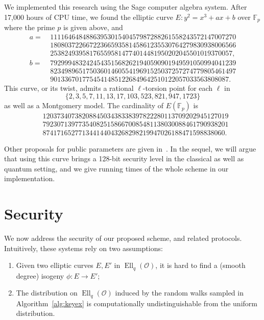 \documentclass{article}
\newcommand{\F}{\mathbb{F}}
\renewcommand{\O}{\mathcal{O}}
\theoremstyle{definition}
\DeclareMathOperator{\Ell}{Ell}
\begin{document}
We implemented this research using the Sage computer algebra system.
After 17,000 hours of CPU time, we found the elliptic curve
$
	E : y^2 = x^3 + ax + b
$
over $\F_p$ where the prime $p$ is given above, and
\[
\begin{aligned}
a =\ & 1111646484886395301540457987288261558243572147007270 \\ 
& 1808037226672236659358145861235530764279830938006566 \\
& 253824939581765595814774014481950202045501019370057,\\
b =\ & 7929994832424543515682621940590901949591050994041239 \\
& 8234989651750360146055419691525037257274779805461497 \\ 
& 90133670177545414851226849642510122057033563808087.
\end{aligned}
\]
This curve, or its twist, admits a rational $\ell$-torsion point 
for each $\ell$ in
\[
  \{2, 3, 5, 7, 11, 13, 17, 103, 523, 821, 947, 1723\}
\]
as well as a Montgomery model. The cardinality of $E(\F_p)$ is
\[
\begin{aligned}
& 1203734073820884503438338397822280113709202945127019 \\ 
& 7923071397735408251586670085481138030088461790938201 \\
& 874171652771344144043268298219947026188471598838060.
\end{aligned}
\]

Other proposals for public parameters are given in~\cite{todo:memoire}.
In the sequel, we will argue that using this curve brings a 128-bit security level
in the classical as well as quantum setting, and we give running times of the whole
scheme in our implementation.

\section{Security}
\label{sec:sec}

We now address the security of our proposed scheme, and related
protocols. Intuitively, these systems rely on two assumptions:
\begin{enumerate}
\item Given two elliptic curves $E,E'$ in $\Ell_q(\O)$, it is hard to
  find a (smooth degree) isogeny $ϕ:E→E'$;
\item The distribution on $\Ell_q(\O)$ induced by the random walks
  sampled in Algorithm~\ref{alg:keyex} is computationally
  undistinguishable from the uniform distribution.
\end{enumerate}
\end{document}
